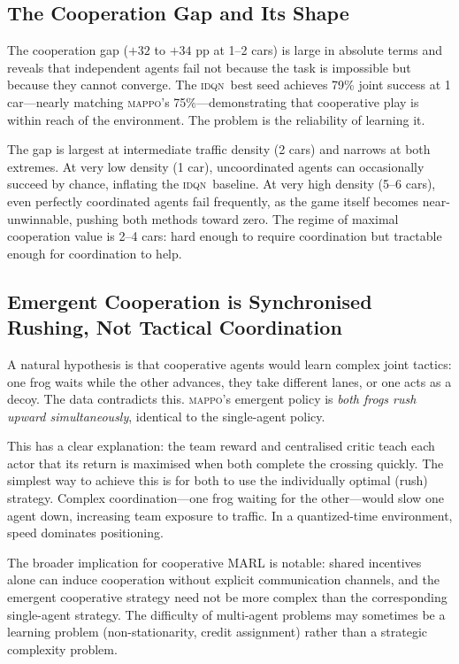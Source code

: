 \documentclass[12pt]{article}
\newcommand{\MAPPO}{\textsc{mappo}}
\newcommand{\IDQN}{\textsc{idqn}}
\begin{document}
\subsection{The Cooperation Gap and Its Shape}

The cooperation gap ($+32$ to $+34$ pp at 1--2 cars) is large in absolute
terms and reveals that independent agents fail not because the task is
impossible but because they cannot converge.  The \IDQN\ best seed achieves
79\% joint success at 1 car—nearly matching \MAPPO's 75\%—demonstrating
that cooperative play is within reach of the environment.  The problem is
the reliability of learning it.

The gap is largest at intermediate traffic density (2 cars) and narrows at
both extremes.  At very low density (1 car), uncoordinated agents can
occasionally succeed by chance, inflating the \IDQN\ baseline.  At very high
density (5--6 cars), even perfectly coordinated agents fail frequently, as
the game itself becomes near-unwinnable, pushing both methods toward zero.
The regime of maximal cooperation value is 2--4 cars: hard enough to require
coordination but tractable enough for coordination to help.

\subsection{Emergent Cooperation is Synchronised Rushing, Not Tactical Coordination}

A natural hypothesis is that cooperative agents would learn complex joint
tactics: one frog waits while the other advances, they take different lanes,
or one acts as a decoy.  The data contradicts this.  \MAPPO's emergent policy
is \emph{both frogs rush upward simultaneously}, identical to the single-agent
policy.

This has a clear explanation: the team reward and centralised critic teach
each actor that its return is maximised when both complete the crossing quickly.
The simplest way to achieve this is for both to use the individually optimal
(rush) strategy.  Complex coordination—one frog waiting for the other—would
slow one agent down, increasing team exposure to traffic.  In a quantized-time
environment, speed dominates positioning.

The broader implication for cooperative MARL is notable: shared incentives
alone can induce cooperation without explicit communication channels, and the
emergent cooperative strategy need not be more complex than the corresponding
single-agent strategy.  The difficulty of multi-agent problems may sometimes
be a learning problem (non-stationarity, credit assignment) rather than a
strategic complexity problem.
\end{document}

